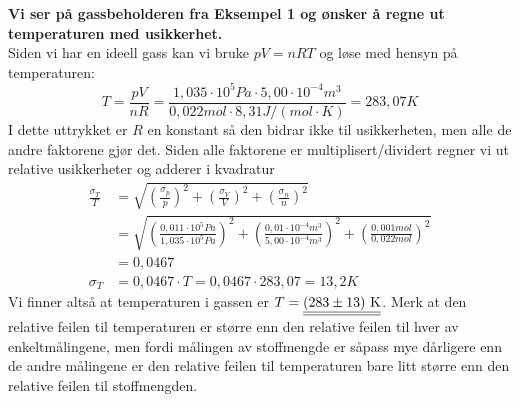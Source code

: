 \begin{texample}
{\bf Vi ser på gassbeholderen fra Eksempel 1 og ønsker å regne ut temperaturen med usikkerhet.}\\

Siden vi har en ideell gass kan vi bruke $pV = nRT$ og løse med hensyn på temperaturen:
\begin{displaymath}
	T = \frac{pV}{nR} = \frac{1,035\cdot 10^5\unit{Pa}\cdot5,00\cdot10^{-4}\unit{m^3}}{0,022\unit{mol}\cdot 8,31\unit{J/(mol\cdot K)}} = 283,07\unit{K}
\end{displaymath}
I dette uttrykket er $R$ en konstant så den bidrar ikke til usikkerheten, men alle de andre faktorene gjør det. Siden alle faktorene er multiplisert/dividert regner vi ut relative usikkerheter og adderer i kvadratur
\begin{align*}
	\frac{\sigma_T}{T} &= \sqrt{\left(\frac{\sigma_p}{p}\right)^2 + \left(\frac{\sigma_V}{V}\right)^2 + \left(\frac{\sigma_n}{n}\right)^2}  \\
	&= \sqrt{\left(\frac{0,011\cdot10^5\unit{Pa}}{1,035\cdot10^5\unit{Pa}}\right)^2 + \left(\frac{0,01\cdot10^{-4}\unit{m^3}}{5,00\cdot10^{-4}\unit{m^3}}\right)^2 
	+ \left(\frac{0,001\unit{mol}}{0,022\unit{mol}}\right)^2}  \\
	&= 0,0467 \\
	\sigma_T &= 0,0467\cdot T = 0,0467\cdot283,07 = 13,2\unit{K}
\end{align*}
Vi finner altså at temperaturen i gassen er $T = \underline{\underline{(283\pm13)~\mathrm{K}}}$. Merk at den relative feilen til temperaturen er større enn den relative feilen til hver av enkeltmålingene, men fordi målingen av stoffmengde er såpass mye dårligere enn de andre målingene er den relative feilen til temperaturen bare litt større enn den relative feilen til stoffmengden.
\end{texample}